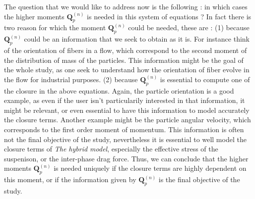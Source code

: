 The question that we would like to address now is the following : in which cases the higher moments $\textbf{Q}_p^{(n)}$ is needed in this system of equations ?
In fact there is two reason for which the moment $\textbf{Q}_p^{(n)}$ could be needed, these are : 
(1) because $\textbf{Q}_p^{(n)}$ could be an information that we seek to obtain as it is.
For instance think of the orientation of fibers in a flow, which correspond to the second moment of the distribution of mass of the particles.  
This information might be the goal of the whole study, as one seek to understand how the orientation of fiber evolve in the flow for industrial purposes. 
(2) because $\textbf{Q}_p^{(n)}$ is essential to compute one of the closure in the above equations. 
Again, the particle orientation is a good example, as even if the user isn't particularily interested in that information, it might be relevant, or even essential to have this information to model accurately the closure terms. 
Another example might be the particle angular velocity, which corresponds to the first order moment of momentum. 
This information is often not the final objective of the study, nevertheless it is essential to well model the closure terms of \textit{The hybrid model}, especially the effective stress of the suspenison, or the inter-phase drag force. 
Thus, we can conclude that the higher moments $\textbf{Q}_p^{(n)}$ is needed uniquely if the closure terms are highly dependent on this moment, or if the information given by $\textbf{Q}_p^{(n)}$ is the final objective of the study. 

